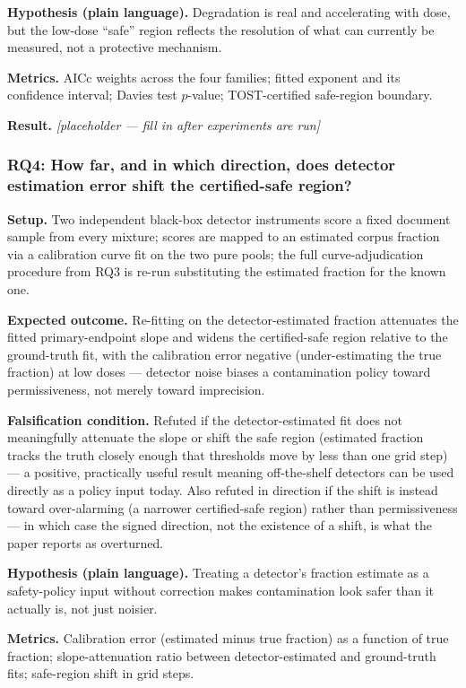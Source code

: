 \documentclass[11pt]{article}
\newcommand{\ph}{\textit{[placeholder --- fill in after experiments are run]}}
\begin{document}
\textbf{Hypothesis (plain language).} Degradation is real and accelerating with dose, but the low-dose ``safe'' region reflects the resolution of what can currently be measured, not a protective mechanism.

\textbf{Metrics.} AICc weights across the four families; fitted exponent and its confidence interval; Davies test $p$-value; TOST-certified safe-region boundary.

\textbf{Result.} \ph

\subsubsection{RQ4: How far, and in which direction, does detector estimation error shift the certified-safe region?}
\textbf{Setup.} Two independent black-box detector instruments score a fixed document sample from every mixture; scores are mapped to an estimated corpus fraction via a calibration curve fit on the two pure pools; the full curve-adjudication procedure from RQ3 is re-run substituting the estimated fraction for the known one.

\textbf{Expected outcome.} Re-fitting on the detector-estimated fraction attenuates the fitted primary-endpoint slope and widens the certified-safe region relative to the ground-truth fit, with the calibration error negative (under-estimating the true fraction) at low doses --- detector noise biases a contamination policy toward permissiveness, not merely toward imprecision.

\textbf{Falsification condition.} Refuted if the detector-estimated fit does not meaningfully attenuate the slope or shift the safe region (estimated fraction tracks the truth closely enough that thresholds move by less than one grid step) --- a positive, practically useful result meaning off-the-shelf detectors can be used directly as a policy input today. Also refuted in direction if the shift is instead toward over-alarming (a narrower certified-safe region) rather than permissiveness --- in which case the signed direction, not the existence of a shift, is what the paper reports as overturned.

\textbf{Hypothesis (plain language).} Treating a detector's fraction estimate as a safety-policy input without correction makes contamination look safer than it actually is, not just noisier.

\textbf{Metrics.} Calibration error (estimated minus true fraction) as a function of true fraction; slope-attenuation ratio between detector-estimated and ground-truth fits; safe-region shift in grid steps.
\end{document}
